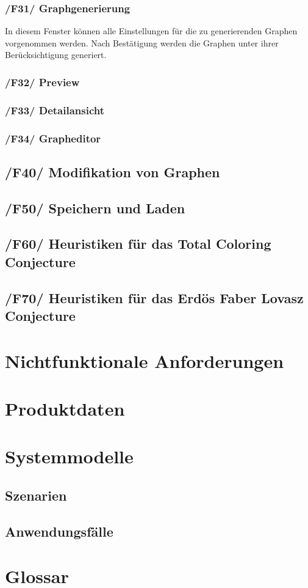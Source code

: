 \documentclass{article}
\begin{document}
	\subsubsection*{/F31/ Graphgenerierung}
	In diesem Fenster können alle Einstellungen für die zu generierenden Graphen vorgenommen werden. Nach Bestätigung werden die Graphen unter ihrer Berücksichtigung generiert.
	
	\subsubsection*{/F32/ Preview}
	
	\subsubsection*{/F33/ Detailansicht}
	
	\subsubsection*{/F34/ Grapheditor}
	
	
	\subsection*{/F40/ Modifikation von Graphen}
	\subsection*{/F50/ Speichern und Laden}
	\subsection*{/F60/ Heuristiken für das Total Coloring Conjecture}
	\subsection*{/F70/ Heuristiken für das Erdös Faber Lovasz Conjecture}
	
	
	
	\section{Nichtfunktionale Anforderungen}
	
	
	
	\section{Produktdaten}
	
	
	
	\section{Systemmodelle}
	\subsection{Szenarien}
	\subsection{Anwendungsfälle}
	
	\section{Glossar}
	\glsaddall
	\printglossaries
\end{document}
